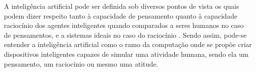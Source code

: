 A inteligência artificial pode ser definida sob diversos pontos de vista os quais podem dizer respeito tanto à capacidade de pensamento quanto à capacidade raciocínio dos agentes inteligentes quando comparados a seres humanos no caso de pensamentos, e a sistemas ideais no caso do raciocínio \cite{norvig2014inteligencia}.
Sendo assim, pode-se entender a inteligência artificial como o ramo da computação onde se propõe criar dispositivos inteligentes capazes de simular uma atividade humana, sendo ela um pensamento, um raciocínio ou mesmo uma atitude.